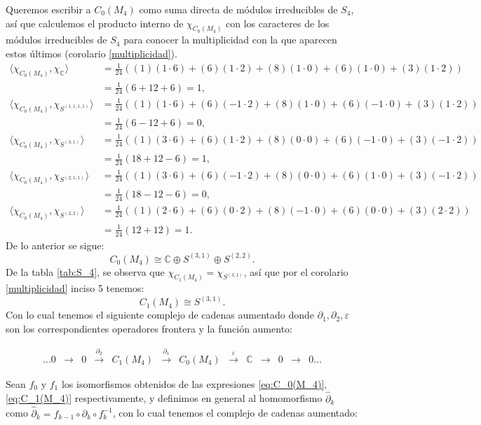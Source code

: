 \documentclass[12pt]{book}
\theoremstyle{definition}
\newcounter{in}
\newcounter{ini}
\begin{document}
Queremos escribir a $C_{0}(M_{4})$ como suma directa de módulos
irreducibles de $S_{4}$, así que calculemos el producto interno de $\chi_{C_{0}(M_{4})}$ con los
caracteres de los módulos irreducibles de $S_{4}$ para conocer la
multiplicidad con la que aparecen estos últimos (corolario \ref{multiplicidad}).
\begin{align*}
  \langle\chi_{C_{0}(M_{4})},\chi_{\mathbb{C}}\rangle &=\frac{1}{24}((1)(1\cdot6)+(6)(1\cdot2)+(8)(1\cdot0)+(6)(1\cdot0)+(3)(1\cdot2))\\
  &=\frac{1}{24}(6+12+6)=1,\\
  \langle\chi_{C_{0}(M_{4})},\chi_{S^{(1,1,1,1)}}\rangle &=\frac{1}{24}((1)(1\cdot6)+(6)(-1\cdot2)+(8)(1\cdot0)+(6)(-1\cdot0)+(3)(1\cdot2))\\
  &=\frac{1}{24}(6-12+6)=0,\\
  \langle\chi_{C_{0}(M_{4})},\chi_{S^{(3,1)}}\rangle &=\frac{1}{24}((1)(3\cdot6)+(6)(1\cdot2)+(8)(0\cdot0)+(6)(-1\cdot0)+(3)(-1\cdot2))\\
  &=\frac{1}{24}(18+12-6)=1,\\
  \langle\chi_{C_{0}(M_{4})},\chi_{S^{(2,1,1)}}\rangle &=\frac{1}{24}((1)(3\cdot6)+(6)(-1\cdot2)+(8)(0\cdot0)+(6)(1\cdot0)+(3)(-1\cdot2))\\
  &=\frac{1}{24}(18-12-6)=0,\\
  \langle\chi_{C_{0}(M_{4})},\chi_{S^{(2,2)}}\rangle &=\frac{1}{24}((1)(2\cdot6)+(6)(0\cdot2)+(8)(-1\cdot0)+(6)(0\cdot0)+(3)(2\cdot2))\\
  &=\frac{1}{24}(12+12)=1.
\end{align*}
De lo anterior se sigue:
\begin{equation}
  \label{eq:C_0(M_4)}
  C_{0}(M_{4})\cong \mathbb{C}\oplus S^{(3,1)}\oplus S^{(2,2)}.
\end{equation}
De la tabla \ref{tab:S_4},
se observa que $\chi_{C_{1}(M_{4})}=\chi_{S^{(3,1)}}$, así que
por el corolario \ref{multiplicidad} inciso 5 tenemos: 
\begin{equation}
  \label{eq:C_1(M_4)}
  C_{1}(M_{4})\cong S^{(3,1)}.
\end{equation}
Con lo cual tenemos el siguiente complejo de cadenas aumentado
donde $\partial_{1},\partial_{2},\varepsilon$ son los correspondientes
operadores frontera y la función aumento:

\begin{small}
  \[
    \begin{array}{ccccccccccccc}
      \dots 0 & \rightarrow & 0 &
      \stackrel{\partial_{2}}{\rightarrow} & C_{1}(M_{4}) &
      \stackrel{\partial_{1}}{\rightarrow} & C_{0}(M_{4}) & \stackrel{\varepsilon}{\rightarrow} &
      \mathbb{C} & \rightarrow  & 0 & \rightarrow & 0 \dots
    \end{array} 
    \]
  \end{small}
Sean $f_{0}$ y $f_{1}$ los isomorfismos obtenidos de las expresiones
\ref{eq:C_0(M_4)}, \ref{eq:C_1(M_4)} respectivamente, y definimos en
general al homomorfismo $\widehat\partial_{k}$ como
$\widehat\partial_{k}=f_{k-1}\circ \partial_{k}\circ f^{-1}_{k}$, con
lo cual tenemos el complejo de cadenas aumentado: 
\end{document}

